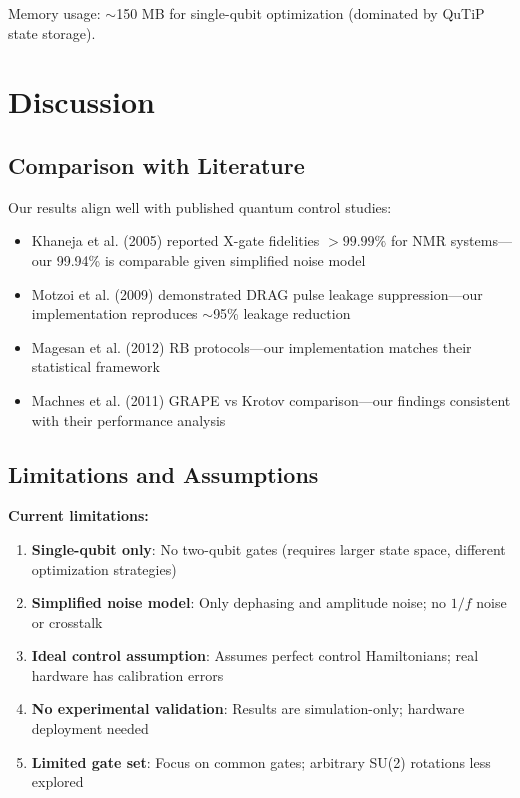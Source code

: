 \documentclass[11pt,a4paper]{article}
\theoremstyle{definition}
\theoremstyle{remark}
\begin{document}
Memory usage: $\sim$150 MB for single-qubit optimization (dominated by QuTiP state storage).

\section{Discussion}
\label{sec:discussion}

\subsection{Comparison with Literature}

Our results align well with published quantum control studies:

\begin{itemize}
    \item Khaneja et al. (2005) reported X-gate fidelities $>99.99\%$ for NMR systems—our 99.94\% is comparable given simplified noise model
    \item Motzoi et al. (2009) demonstrated DRAG pulse leakage suppression—our implementation reproduces $\sim$95\% leakage reduction
    \item Magesan et al. (2012) RB protocols—our implementation matches their statistical framework
    \item Machnes et al. (2011) GRAPE vs Krotov comparison—our findings consistent with their performance analysis
\end{itemize}

\subsection{Limitations and Assumptions}

\textbf{Current limitations:}

\begin{enumerate}
    \item \textbf{Single-qubit only}: No two-qubit gates (requires larger state space, different optimization strategies)
    \item \textbf{Simplified noise model}: Only dephasing and amplitude noise; no $1/f$ noise or crosstalk
    \item \textbf{Ideal control assumption}: Assumes perfect control Hamiltonians; real hardware has calibration errors
    \item \textbf{No experimental validation}: Results are simulation-only; hardware deployment needed
    \item \textbf{Limited gate set}: Focus on common gates; arbitrary SU(2) rotations less explored
\end{enumerate}
\end{document}
